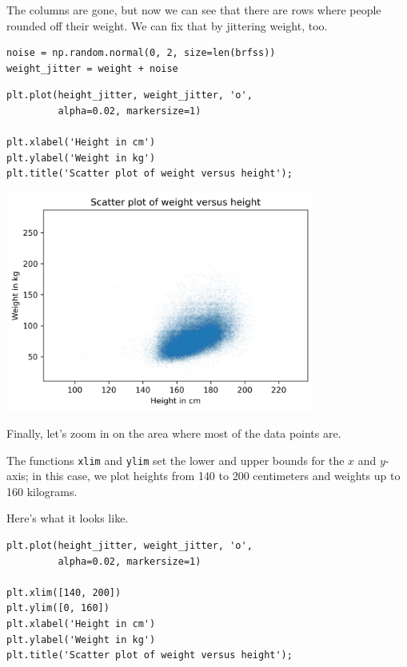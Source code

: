 The columns are gone, but now we can see that there are rows where
people rounded off their weight. We can fix that by jittering weight,
too.

\begin{lstlisting}[]
noise = np.random.normal(0, 2, size=len(brfss))
weight_jitter = weight + noise
\end{lstlisting}

\begin{lstlisting}[]
plt.plot(height_jitter, weight_jitter, 'o', 
         alpha=0.02, markersize=1)

plt.xlabel('Height in cm')
plt.ylabel('Weight in kg')
plt.title('Scatter plot of weight versus height');
\end{lstlisting}

\begin{center}
\includegraphics[width=4in]{chapters/09_relationships_files/09_relationships_24_0.png}
\end{center}

Finally, let's zoom in on the area where most of the data points are.

The functions \passthrough{\lstinline!xlim!} and
\passthrough{\lstinline!ylim!} set the lower and upper bounds for the
\(x\) and \(y\)-axis; in this case, we plot heights from 140 to 200
centimeters and weights up to 160 kilograms.

Here's what it looks like.

\begin{lstlisting}[]
plt.plot(height_jitter, weight_jitter, 'o', 
         alpha=0.02, markersize=1)

plt.xlim([140, 200])
plt.ylim([0, 160])
plt.xlabel('Height in cm')
plt.ylabel('Weight in kg')
plt.title('Scatter plot of weight versus height');
\end{lstlisting}

